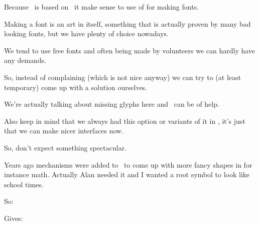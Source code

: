 

\startdocument
  [title={METAFUN},
   banner={simple fonts},
   location={context\enspace {\bf 2020}\enspace meeting}]

\starttitle[title=Metafonts]

\startitemize

\startitem
    Because \METAPOST\ is based on \METAFONT\ it make sense to use of for making fonts.
\stopitem

\startitem
    Making a font is an art in itself, something that is actually proven by many bad
    looking fonts, but we have plenty of choice nowadays.
\stopitem

\startitem
    We tend to use free fonts and often being made by volunteers we can hardly have any
    demands.
\stopitem

\startitem
    So, instead of complaining (which is not nice anyway) we can try to (at least temporary)
    come up with a solution ourselves.
\stopitem

\startitem
    We're actually talking about missing glyphs here and \METAPOST\ can be of help.
\stopitem

\startitem
    Also keep in mind that we always had this option or variants of it in \CONTEXT, it's
    just that we can make nicer interfaces now.
\stopitem

\startitem
    So, don't expect something spectacular.
\stopitem

\stopitemize

\stoptitle

\starttitle[title=What is is not]

Years ago mechanisms were added to \MKIV\ to come up with more fancy shapes in
for instance math. Actually Alan needed it and I wanted a root symbol to look
like school times.

\startbuffer
\useMPlibrary[mat]

\setupmathradical[color=darkgray,alternative=mp]

\stopbuffer

\typebuffer \getbuffer

So:

\startbuffer
{}
\stopbuffer

\typebuffer

Gives:

\startlinecorrection
\getbuffer
\stoplinecorrection

